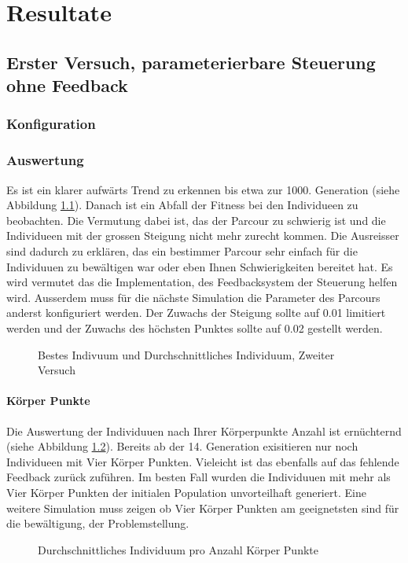 %
%


\chapter{Resultate\label{chap:Resulate}}

\section{Erster Versuch, parameterierbare Steuerung ohne Feedback}

  \subsection{Konfiguration}
      

  \subsection{Auswertung}
    Es ist ein klarer aufwärts Trend zu erkennen bis etwa zur 1000. Generation (siehe Abbildung \ref{fig:graphFirst}).
    Danach ist ein Abfall der Fitness bei den Individueen zu beobachten.
    Die Vermutung dabei ist, das der Parcour zu schwierig ist und die Individueen
    mit der grossen Steigung nicht mehr zurecht kommen. Die Ausreisser sind dadurch zu erklären,
    das ein bestimmer Parcour sehr einfach für die Individuuen zu bewältigen war oder eben Ihnen Schwierigkeiten bereitet hat.
    Es wird vermutet das die Implementation, des Feedbacksystem der Steuerung helfen wird.
    Ausserdem muss für die nächste Simulation die Parameter des Parcours anderst konfiguriert werden.
    Der Zuwachs der Steigung sollte auf 0.01 limitiert werden und der Zuwachs des höchsten Punktes
    sollte auf 0.02 gestellt werden.
      \begin{figure}
        
        \caption{Bestes Indivuum und Durchschnittliches Individuum, Zweiter Versuch}
        \label{fig:graphFirst}
      \end{figure}

  \subsubsection{Körper Punkte}
    Die Auswertung der Individuuen nach Ihrer Körperpunkte Anzahl ist ernüchternd (siehe Abbildung \ref{fig:graphBpFirst}).
    Bereits ab der 14. Generation exisitieren nur noch Individueen mit Vier Körper Punkten.
    Vieleicht ist das ebenfalls auf das fehlende Feedback zurück zuführen. Im besten Fall
    wurden die Individuuen mit mehr als Vier Körper Punkten der initialen Population unvorteilhaft generiert.
    Eine weitere Simulation muss zeigen ob Vier Körper Punkten am geeignetsten sind für die bewältigung,
    der Problemstellung.
  \begin{figure}
    
    \caption{Durchschnittliches Individuum pro Anzahl Körper Punkte}
    \label{fig:graphBpFirst}
  \end{figure}

